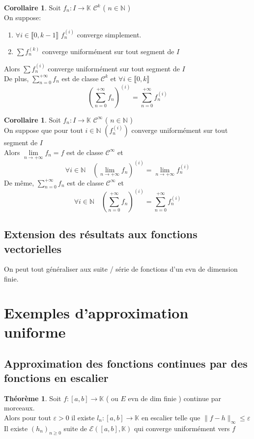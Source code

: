 \documentclass[10pt,a4paper]{article}
\theoremstyle{definition}
\newtheorem{theorem}[proposition]{Théorème}
\newtheorem{corollaire}[proposition]{Corollaire}
\begin{document}
\begin{corollaire}
    Soit $f_n: I \to \mathbb{K}$ $\mathcal{C}^k$ ( $n \in \mathbb{N}$ ) \\
    On suppose:
    \begin{enumerate}
        \item $\forall i \in \llbracket 0, k-1 \rrbracket$ $f_n^{(i)}$ converge simplement.
        \item $\sum f_n^{(k)}$ converge uniformément sur tout segment de $I$
    \end{enumerate}
    Alors $\sum f_n^{(i)}$ converge uniformément sur tout segment de $I$ \\
    De plus, $\sum\limits_{n = 0}^{+\infty} f_n$ est de classe $\mathcal{C}^k$ et $\forall i \in \llbracket 0, k \rrbracket$
    \[\boxed{\left(\sum_{n = 0}^{+\infty}f_n\right)^{(i)} = \sum_{n = 0}^{+\infty}f_n^{(i)}}\]
\end{corollaire}
\begin{corollaire}
    Soit $f_n: I \to \mathbb{K}$ $\mathcal{C}^\infty$ ( $n \in \mathbb{N}$ ) \\
    On suppose que pour tout $i \in \mathbb{N}$ $\left(f_n^{(i)}\right)$ converge uniformément sur tout segment de $I$ \\
    Alors $\lim\limits_{n \to +\infty} f_n = f$ est de classe $\mathcal{C}^\infty$ et
    \[ \forall i \in \mathbb{N} \quad \left(\lim_{n \to +\infty} f_n\right)^{(i)} = \lim_{n \to +\infty} f_n^{(i)} \]
    De même, $\sum\limits_{n = 0}^{+\infty} f_n$ est de classe $\mathcal{C}^\infty$ et
    \[ \forall i \in \mathbb{N} \quad \left(\sum\limits_{n = 0}^{+\infty} f_n\right)^{(i)} = \sum\limits_{n = 0}^{+\infty} f_n^{(i)} \]
\end{corollaire}

\subsection{Extension des résultats aux fonctions vectorielles}
\noindent On peut tout généraliser aux suite / série de fonctions d'un evn de dimension finie.

\section{Exemples d'approximation uniforme}
\subsection{Approximation des fonctions continues par des fonctions en escalier}
\begin{theorem}
    Soit $f: [a, b] \to \mathbb{K}$ ( ou $E$ evn de dim finie ) continue par morceaux. \\
    Alors pour tout $\varepsilon > 0$ il existe $l_n: [a, b] \to \mathbb{K}$ en escalier telle que $\lVert f - h \rVert_\infty \leq \varepsilon$ \\
    Il existe $(h_n)_{n \geq 0}$ suite de $\mathcal{E}\left([a, b], \mathbb{K}\right)$ qui converge uniformément vers $f$
\end{theorem}
\end{document}
